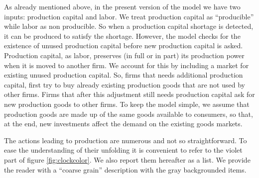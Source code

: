 \documentclass{book}
\begin{document}
\label{pg:inputs2}
As already mentioned above, in the present version of the model we have two inputs: production capital and labor. We treat production capital as ``producible'' while labor as non producible. So when a production capital shortage is detected, it can be produced to satisfy the shortage. However, the model checks for the existence of unused production capital before new production capital is asked.
Production capital, as labor, preserves (in full or in part) its production power when it is moved to another firm. %
We account for this by including a market for existing unused production capital. So, firms that needs additional production capital, first try to buy already existing production goods that are not used by other firms. Firms that after this adjustment still needs production capital ask for new production goods to other firms. To keep the model simple, we assume that production goods are made up of the same goods available to consumers, so that, at the end, new investments affect the demand on the existing goods markets.



The actions leading to production are numerous and not so straightforward. To ease the understanding of their unfolding it is convenient to refer to the violet part of figure \ref{fig:clockcolor}. We also report them hereafter as a list. We provide the reader with a ``coarse grain'' description with the gray backgrounded items.
\end{document}
